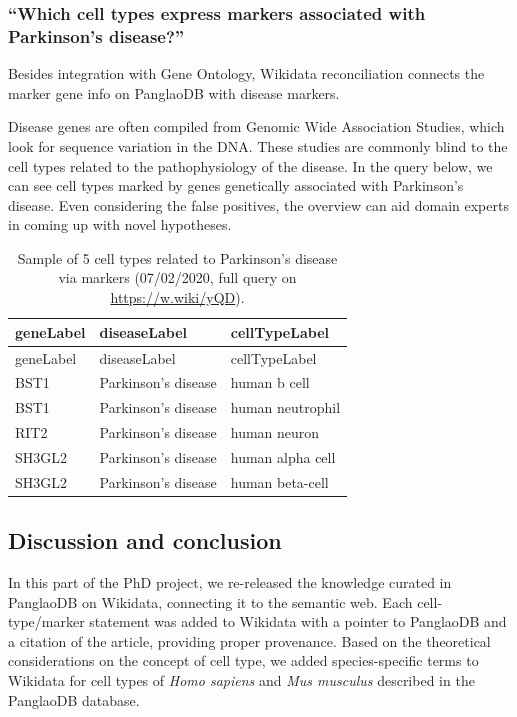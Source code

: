 \hypertarget{which-cell-types-express-markers-associated-with-parkinsons-disease}{%
\subsubsection{``Which cell types express markers associated with Parkinson's disease?''}\label{which-cell-types-express-markers-associated-with-parkinsons-disease}}

Besides integration with Gene Ontology, Wikidata reconciliation connects the marker gene info on PanglaoDB with disease markers.

Disease genes are often compiled from Genomic Wide Association Studies, which look for sequence variation in the DNA.
These studies are commonly blind to the cell types related to the pathophysiology of the disease.
In the query below, we can see cell types marked by genes genetically associated with Parkinson's disease.
Even considering the false positives, the overview can aid domain experts in coming up with novel hypotheses.

\begin{longtable}[]{@{}lll@{}}
\caption{Sample of 5 cell types related to Parkinson's disease via markers (07/02/2020, full query on \url{https://w.wiki/yQD}).
\label{tbl:parkinson}}\tabularnewline
\toprule
geneLabel & diseaseLabel & cellTypeLabel \\
\midrule
\endfirsthead
\toprule
geneLabel & diseaseLabel & cellTypeLabel \\
\midrule
\endhead
BST1 & Parkinson's disease & human b cell \\
BST1 & Parkinson's disease & human neutrophil \\
RIT2 & Parkinson's disease & human neuron \\
SH3GL2 & Parkinson's disease & human alpha cell \\
SH3GL2 & Parkinson's disease & human beta-cell \\
\bottomrule
\end{longtable}

\hypertarget{discussion-and-conclusion}{%
\subsection{Discussion and conclusion}\label{discussion-and-conclusion}}

In this part of the PhD project, we re-released the knowledge curated in PanglaoDB on Wikidata, connecting it to the semantic web.
Each cell-type/marker statement was added to Wikidata with a pointer to PanglaoDB and a citation of the article, providing proper provenance.
Based on the theoretical considerations on the concept of cell type, we added species-specific terms to Wikidata for cell types of \emph{Homo sapiens} and \emph{Mus musculus} described in the PanglaoDB database.


